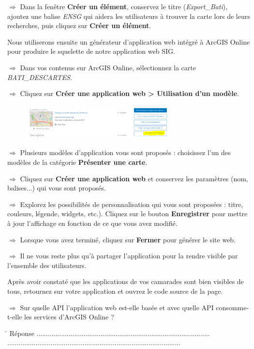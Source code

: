 \documentclass[11pt]{article}
\newcommand{\action}{$\Rightarrow$ }
\newcommand{\reponse}{
	\begin{tabbing}
	\hspace{2cm}\=\kill
	Réponse \> ............................................................................................ \\
 	\> ............................................................................................
	\end{tabbing}
}
\begin{document}
\action Dans la fenêtre \textbf{Créer un élément}, conservez le titre (\textit{Export\_Bati}), ajoutez une balise \textit{ENSG} qui aidera les utilisateurs à trouver la carte lors de leurs recherches, puis cliquez sur \textbf{Créer un élément}.

Nous utiliserons ensuite un générateur d'application web intégré à ArcGIS Online pour produire le squelette de notre application web SIG.

\action Dans vos contenus sur ArcGIS Online, sélectionnez la carte \textit{BATI\_DESCARTES}.

\action Cliquez sur \textbf{Créer une application web > Utilisation d'un modèle}.
\begin{figure}[H]
	\center \includegraphics[width=0.7\textwidth]{img/cours3/ago_creer_appli_web.png} \\
\end{figure}

\action Plusieurs modèles d'application vous sont proposés : choisissez l'un des modèles de la catégorie \textbf{Présenter une carte}.

\action Cliquez sur \textbf{Créer une application web} et conservez les paramètres (nom, balises...) qui vous sont proposés.

\action Explorez les possibilités de personnalisation qui vous sont proposées : titre, couleurs, légende, widgets, etc.). Cliquez sur le bouton \textbf{Enregistrer} pour mettre à jour l'affichage en fonction de ce que vous avez modifié.

\action Lorsque vous avez terminé, cliquez sur \textbf{Fermer} pour générer le site web.

\action Il ne vous reste plus qu'à partager l'application pour la rendre visible par l'ensemble des utilisateurs.

Après avoir constaté que les applications de vos camarades sont bien visibles de tous, retournez sur votre application et ouvrez le code source de la page.

\action Sur quelle API l'application web est-elle basée et avec quelle API consomme-t-elle les services d’ArcGIS Online ?

\reponse
\end{document}

